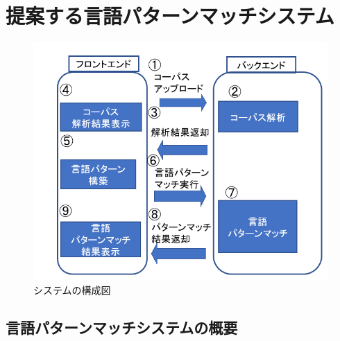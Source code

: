 \documentclass{FITpaper}
\begin{document}
\section{提案する言語パターンマッチシステム}
\begin{figure}[htbp]
  \centering
  \includegraphics[scale=0.4]{fig/system_fig.png}
  \caption{システムの構成図}
  \label{fig:sys}
\end{figure}
\subsection{言語パターンマッチシステムの概要}
\end{document}
